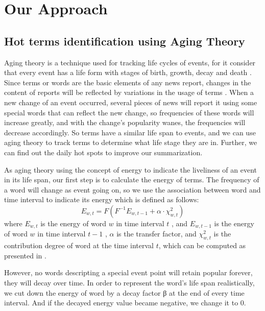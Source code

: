 \documentclass[runningheads,a4paper]{llncs}
\begin{document}
\section{Our Approach}

\subsection{Hot terms identification using Aging Theory}

Aging theory is a technique used for tracking life cycles of events, for it consider that every event has a life form with stages of birth, growth, decay and death \cite{2003-Chen-p47-59}. Since terms or words are the basic elements of any news report, changes in the content of reports will be reflected by variations in the usage of terms \cite{2007-Chen-p1016-1025}. When a new change of an event occurred, several pieces of news will report it using some special words that can reflect the new change, so frequencies of these words will increase greatly, and with the change’s popularity wanes, the frequencies will decrease accordingly. So terms have a similar life span to events, and we can use aging theory to track terms to determine what life stage they are in. Further, we can find out the daily hot spots to improve our summarization.

As aging theory using the concept of energy to indicate the liveliness of an event in its life span, our first step is to calculate the energy of terms. The frequency of a word will change as event going on, so we use the association between word  and time interval  to indicate its energy which is defined as follows:
\begin{equation}
  E_{w,t} =F(F^{-1}E_{w,t-1}+\alpha\cdot\chi^2_{w,t})
\end{equation}
where $E_{w,t}$ is the energy of word $w$  in time interval $t$ , and $E_{w,t-1}$  is the energy of word $w$ in time interval $t-1$ , $\alpha$ is the transfer factor, and $\chi^2_{w,t}$  is the contribution degree of word  at the time interval $t$, which can be computed as presented in \cite{2000-Swan-p49-56}. 

However, no words descripting a special event point will retain popular forever, they will decay over time. In order to represent the word's life span realistically, we cut down the energy of word by a decay factor β at the end of every time interval. And if the decayed energy value became negative, we change it to 0.
\end{document}
